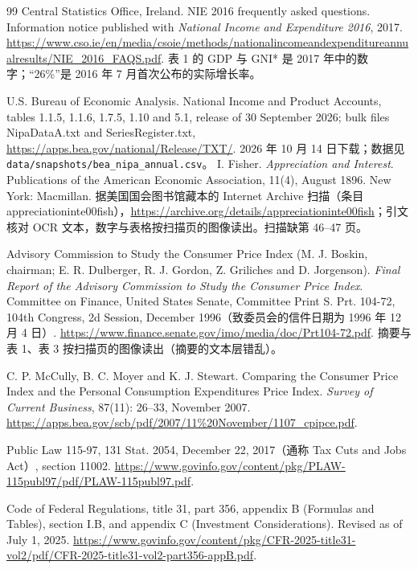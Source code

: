 \begin{thebibliography}{99}
 Central Statistics Office, Ireland. NIE 2016 frequently asked questions. Information notice published with \emph{National Income and Expenditure 2016}, 2017. \url{https://www.cso.ie/en/media/csoie/methods/nationalincomeandexpenditureannualresults/NIE_2016_FAQS.pdf}. 表 1 的 GDP 与 GNI* 是 2017 年中的数字；“26\%”是 2016 年 7 月首次公布的实际增长率。

 U.S. Bureau of Economic Analysis. National Income and Product Accounts, tables 1.1.5, 1.1.6, 1.7.5, 1.10 and 5.1, release of 30 September 2026; bulk files NipaDataA.txt and SeriesRegister.txt, \url{https://apps.bea.gov/national/Release/TXT/}. 2026 年 10 月 14 日下载；数据见 \texttt{data/snapshots/bea\_nipa\_annual.csv}。
 I. Fisher. \emph{Appreciation and Interest}. Publications of the American Economic Association, 11(4), August 1896. New York: Macmillan. 据美国国会图书馆藏本的 Internet Archive 扫描（条目 appreciationinte00fish），\url{https://archive.org/details/appreciationinte00fish}；引文核对 OCR 文本，数字与表格按扫描页的图像读出。扫描缺第 46--47 页。

 Advisory Commission to Study the Consumer Price Index (M. J. Boskin, chairman; E. R. Dulberger, R. J. Gordon, Z. Griliches and D. Jorgenson). \emph{Final Report of the Advisory Commission to Study the Consumer Price Index}. Committee on Finance, United States Senate, Committee Print S. Prt. 104-72, 104th Congress, 2d Session, December 1996（致委员会的信件日期为 1996 年 12 月 4 日）. \url{https://www.finance.senate.gov/imo/media/doc/Prt104-72.pdf}. 摘要与表 1、表 3 按扫描页的图像读出（摘要的文本层错乱）。

 C. P. McCully, B. C. Moyer and K. J. Stewart. Comparing the Consumer Price Index and the Personal Consumption Expenditures Price Index. \emph{Survey of Current Business}, 87(11): 26--33, November 2007. \url{https://apps.bea.gov/scb/pdf/2007/11\%20November/1107_cpipce.pdf}.

 Public Law 115-97, 131 Stat. 2054, December 22, 2017（通称 Tax Cuts and Jobs Act）, section 11002. \url{https://www.govinfo.gov/content/pkg/PLAW-115publ97/pdf/PLAW-115publ97.pdf}.

 Code of Federal Regulations, title 31, part 356, appendix B (Formulas and Tables), section I.B, and appendix C (Investment Considerations). Revised as of July 1, 2025. \url{https://www.govinfo.gov/content/pkg/CFR-2025-title31-vol2/pdf/CFR-2025-title31-vol2-part356-appB.pdf}.


\end{thebibliography}
